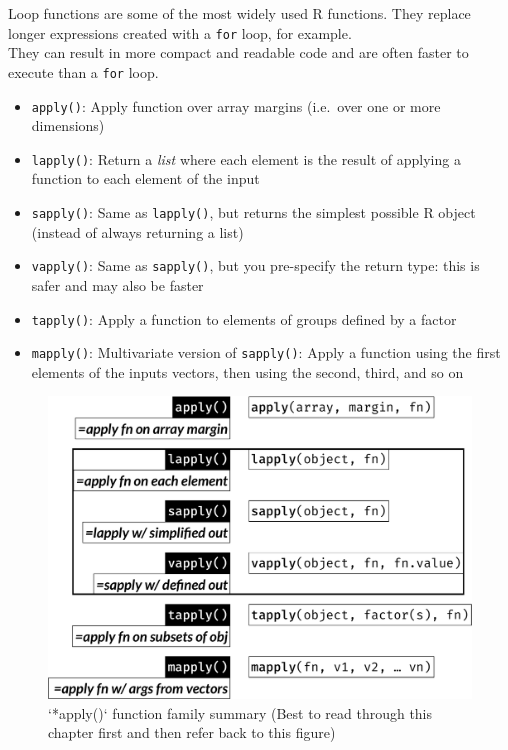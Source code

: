 \documentclass[
]{book}
\providecommand{\tightlist}{%
  \setlength{\itemsep}{0pt}\setlength{\parskip}{0pt}}
\begin{document}
Loop functions are some of the most widely used R functions. They replace longer expressions created with a \texttt{for} loop, for example.\\
They can result in more compact and readable code and are often faster to execute than a \texttt{for} loop.

\begin{itemize}
\tightlist
\item
  \texttt{apply()}: Apply function over array margins (i.e.~over one or more dimensions)
\item
  \texttt{lapply()}: Return a \emph{list} where each element is the result of applying a function to each element of the input
\item
  \texttt{sapply()}: Same as \texttt{lapply()}, but returns the simplest possible R object (instead of always returning a list)
\item
  \texttt{vapply()}: Same as \texttt{sapply()}, but you pre-specify the return type: this is safer and may also be faster
\item
  \texttt{tapply()}: Apply a function to elements of groups defined by a factor
\item
  \texttt{mapply()}: Multivariate version of \texttt{sapply()}: Apply a function using the first elements of the inputs vectors, then using the second, third, and so on
\end{itemize}

\begin{figure}

{\centering \includegraphics[width=0.75\linewidth]{./R_applyfam} 

}

\caption{`*apply()` function family summary (Best to read through this chapter first and then refer back to this figure)}\label{fig:FigRapplyfam}
\end{figure}
\end{document}
